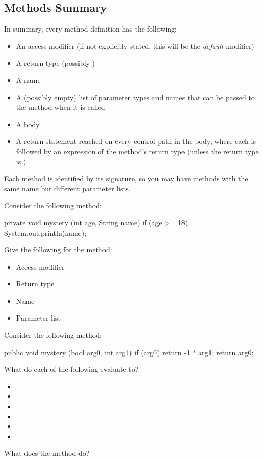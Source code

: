 \subsection{Methods Summary}
In summary, every method definition has the following:
\begin{itemize}
\item An access modifier (if not explicitly stated, this will be the \emph{default} modifier)
\item A return type (possibly )
\item A name
\item A (possibly empty) list of parameter types and names that can be passed to the method when it is called
\item A body
\item A return statement reached on every control path in the body, where each  is followed by an
expression of the method's return type (unless the return type is )
\end{itemize}
Each method is identified by its signature, so you may have methods with the same name but different parameter lists.

\begin{example}
Consider the following method:
\begin{code}
private void mystery (int age, String name) {
  if (age >= 18) {
    System.out.println(name);
  }
}
\end{code} 
Give the following for the method:
\begin{itemize}
\item Access modifier
\item Return type
\item Name
\item Parameter list
\end{itemize}
\end{example}

\begin{example}
Consider the following method:
\begin{code}
public void mystery (bool arg0, int arg1) {
  if (arg0) {
    return -1 * arg1;
  }
  return arg0;
}
\end{code}

\noindent What do each of the following evaluate to?
\begin{itemize}
\item {}
\item {}
\item {}
\item {}
\item {}
\item {}
\end{itemize}

\noindent What does the method do?

\end{example}

